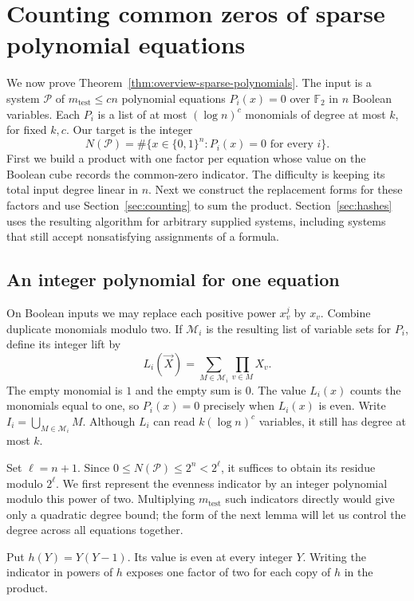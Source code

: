\documentclass[11pt,reqno]{amsart}
\numberwithin{equation}{section}
\theoremstyle{definition}\newtheorem{definition}[theorem]{Definition}
\theoremstyle{remark}\newtheorem{remark}[theorem]{Remark}
\renewcommand{\le}{\leqslant}
\begin{document}
\section{Counting common zeros of sparse polynomial equations}\label{sec:setup}
We now prove Theorem~\ref{thm:overview-sparse-polynomials}. The input
is a system $\mathcal P$ of $m_{\mathrm{test}}\le cn$ polynomial equations
$P_i(x)=0$ over $\mathbb F_2$ in $n$ Boolean variables. Each $P_i$ is a
list of at most $(\log n)^c$ monomials of degree at most $k$, for fixed
$k,c$. Our target is the integer
\begin{equation}\label{eq:common-zero-count}
 N(\mathcal P)=\#\{x\in\{0,1\}^n:P_i(x)=0\text{ for every }i\}.
\end{equation}
First we build a product with one factor per equation whose value on
the Boolean cube records the common-zero indicator. The difficulty is
keeping its total input degree linear in $n$. Next we construct the
replacement forms for these factors and use Section~\ref{sec:counting}
to sum the product. Section~\ref{sec:hashes} uses the resulting
algorithm for arbitrary supplied systems, including systems that still
accept nonsatisfying assignments of a formula.

\subsection{An integer polynomial for one equation}\label{subsec:rational-lift}
On Boolean inputs we may replace each positive power $x_v^j$ by $x_v$.
Combine duplicate monomials modulo two. If $\mathcal M_i$ is the
resulting list of variable sets for $P_i$, define its integer lift by
\[
 L_i(\vec X)=\sum_{M\in\mathcal M_i}\prod_{v\in M}X_v .
\]
The empty monomial is $1$ and the empty sum is $0$. The value $L_i(x)$
counts the monomials equal to one, so $P_i(x)=0$ precisely when
$L_i(x)$ is even. Write $I_i=\bigcup_{M\in\mathcal M_i}M$. Although
$L_i$ can read $k(\log n)^c$ variables, it still has degree at most $k$.

Set $\ell=n+1$. Since $0\le N(\mathcal P)\le2^n<2^\ell$, it suffices
to obtain its residue modulo $2^\ell$. We first represent the
evenness indicator by an integer polynomial modulo this power of two.
Multiplying $m_{\mathrm{test}}$ such indicators directly would give
only a quadratic degree bound; the form of the next lemma will let us
control the degree across all equations together.

Put $h(Y)=Y(Y-1)$. Its value is even at every integer $Y$.
Writing the indicator in powers of $h$ exposes one factor of two for
each copy of $h$ in the product.
\end{document}
